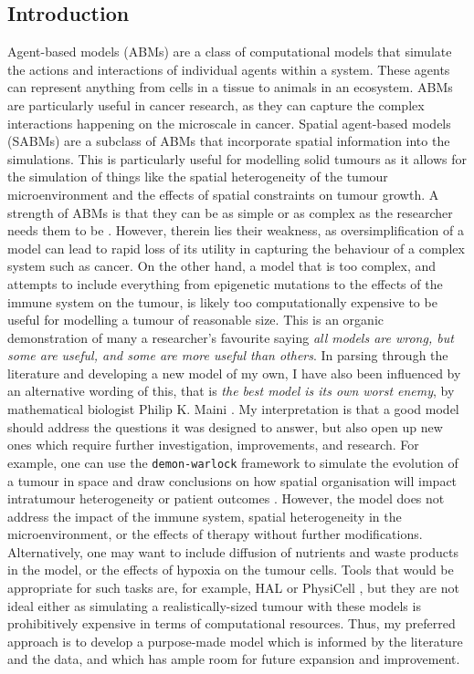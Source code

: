 \subsection{Introduction}
Agent-based models (ABMs) are a class of computational models that simulate the
actions and interactions of individual agents within a system. These agents can
represent anything from cells in a tissue to animals in an ecosystem. ABMs are
particularly useful in cancer research, as they can capture the complex
interactions happening on the microscale in cancer. Spatial agent-based models
(SABMs) are a subclass of ABMs that incorporate spatial information into the
simulations. This is particularly useful for modelling solid tumours as it
allows for the simulation of things like the spatial heterogeneity of the
tumour microenvironment and the effects of spatial constraints on tumour
growth. A strength of ABMs is that they can be as simple or as complex as the
researcher needs them to be \cite{colyer_seven-step_2023}. However, therein
lies their weakness, as oversimplification of a model can lead to rapid loss of
its utility in capturing the behaviour of a complex system such as cancer. On
the other hand, a model that is too complex, and attempts to include everything
from epigenetic mutations to the effects of the immune system on the tumour, is
likely too computationally expensive to be useful for modelling a tumour of
reasonable size. This is an organic demonstration of many a researcher's
favourite saying \textit{all models are wrong, but some are useful, and some
are more useful than others}. In parsing through the literature and developing
a new model of my own, I have also been influenced by an alternative wording of
this, that is \textit{the best model is its own worst enemy}, by mathematical
biologist Philip K. Maini \cite{maini_talk_2023}. My interpretation is that a
good model should address the questions it was designed to answer, but also
open up new ones which require further investigation, improvements, and
research. For example, one can use the \texttt{demon-warlock} framework
\cite{bak_warlock_2023} to simulate the evolution of a tumour in space and draw
conclusions on how spatial organisation will impact intratumour heterogeneity
or patient outcomes \cite{noble_when_2020, noble_spatial_2022}. However, the
model does not address the impact of the immune system, spatial heterogeneity
in the microenvironment, or the effects of therapy without further
modifications. Alternatively, one may want to include diffusion of nutrients
and waste products in the model, or the effects of hypoxia on the tumour cells.
Tools that would be appropriate for such tasks are, for example, HAL
\cite{bravo_hybrid_2020} or PhysiCell \cite{ghaffarizadeh_physicell_2018}, but
they are not ideal either as simulating a realistically-sized tumour with these
models is prohibitively expensive in terms of computational resources. Thus, my
preferred approach is to develop a purpose-made model which is informed by the
literature and the data, and which has ample room for future expansion and
improvement.

